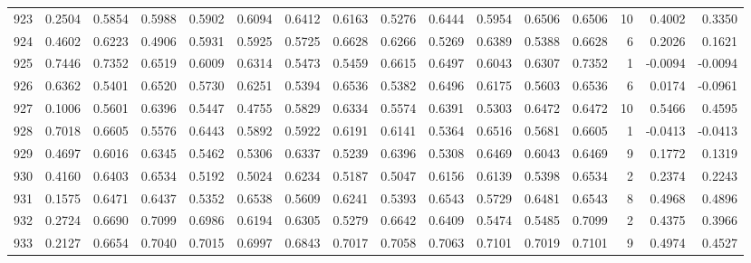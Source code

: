 \begin{tabular}{lrrrrrrrrrrrrrrr}
923 &      0.2504 &  0.5854 &  0.5988 &  0.5902 &  0.6094 &  0.6412 &  0.6163 &  0.5276 &  0.6444 &  0.5954 &   0.6506 &     0.6506 &     10 &                    0.4002 &                     0.3350 \\
924 &      0.4602 &  0.6223 &  0.4906 &  0.5931 &  0.5925 &  0.5725 &  0.6628 &  0.6266 &  0.5269 &  0.6389 &   0.5388 &     0.6628 &      6 &                    0.2026 &                     0.1621 \\
925 &      0.7446 &  0.7352 &  0.6519 &  0.6009 &  0.6314 &  0.5473 &  0.5459 &  0.6615 &  0.6497 &  0.6043 &   0.6307 &     0.7352 &      1 &                   -0.0094 &                    -0.0094 \\
926 &      0.6362 &  0.5401 &  0.6520 &  0.5730 &  0.6251 &  0.5394 &  0.6536 &  0.5382 &  0.6496 &  0.6175 &   0.5603 &     0.6536 &      6 &                    0.0174 &                    -0.0961 \\
927 &      0.1006 &  0.5601 &  0.6396 &  0.5447 &  0.4755 &  0.5829 &  0.6334 &  0.5574 &  0.6391 &  0.5303 &   0.6472 &     0.6472 &     10 &                    0.5466 &                     0.4595 \\
928 &      0.7018 &  0.6605 &  0.5576 &  0.6443 &  0.5892 &  0.5922 &  0.6191 &  0.6141 &  0.5364 &  0.6516 &   0.5681 &     0.6605 &      1 &                   -0.0413 &                    -0.0413 \\
929 &      0.4697 &  0.6016 &  0.6345 &  0.5462 &  0.5306 &  0.6337 &  0.5239 &  0.6396 &  0.5308 &  0.6469 &   0.6043 &     0.6469 &      9 &                    0.1772 &                     0.1319 \\
930 &      0.4160 &  0.6403 &  0.6534 &  0.5192 &  0.5024 &  0.6234 &  0.5187 &  0.5047 &  0.6156 &  0.6139 &   0.5398 &     0.6534 &      2 &                    0.2374 &                     0.2243 \\
931 &      0.1575 &  0.6471 &  0.6437 &  0.5352 &  0.6538 &  0.5609 &  0.6241 &  0.5393 &  0.6543 &  0.5729 &   0.6481 &     0.6543 &      8 &                    0.4968 &                     0.4896 \\
932 &      0.2724 &  0.6690 &  0.7099 &  0.6986 &  0.6194 &  0.6305 &  0.5279 &  0.6642 &  0.6409 &  0.5474 &   0.5485 &     0.7099 &      2 &                    0.4375 &                     0.3966 \\
933 &      0.2127 &  0.6654 &  0.7040 &  0.7015 &  0.6997 &  0.6843 &  0.7017 &  0.7058 &  0.7063 &  0.7101 &   0.7019 &     0.7101 &      9 &                    0.4974 &                     0.4527 \\

\end{tabular}
